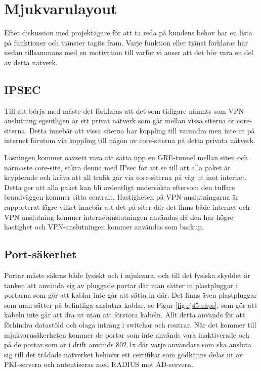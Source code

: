 \section{Mjukvarulayout}
Efter diskussion med projektägare för att ta reda på kundens behov har en lista på funktioner och tjänster tagits fram. Varje funktion eller tjänst förklaras här nedan tillsammans med en motivation till varför vi anser att det bör vara en del av detta nätverk.

\subsection{IPSEC}
    Till att börja med måste det förklaras att det som tidigare nämnts som VPN-anslutning egentligen är ett privat nätverk som går mellan vissa siterna or core-siterna. Detta innebär att vissa siterna har koppling till varandra men inte ut på internet förutom via koppling till någon av core-siterna på detta privata nätverk.
    
\noindent Lösningen kommer oavsett vara att sätta upp en GRE-tunnel mellan siten och närmaste core-site, säkra denna med IPsec för att se till att alla paket är krypterade och kräva att all trafik går via core-siterna på väg ut mot internet. Detta ger att alla paket kan bli ordentligt undersökta eftersom den tuffare brandväggen kommer sitta centralt. Hastigheten på VPN-anslutningarna är rapporterat lägre vilket innebär att det på siter där det finns både internet och VPN-anslutning kommer internetanslutningen användas då den har högre hastighet och VPN-anslutningen kommer användas som backup.

\subsection{Port-säkerhet}
    Portar måste säkras både fysiskt och i mjukvara, och till det fysiska skyddet är tanken att använda sig av pluggade portar där man sätter in plastpluggar i portarna som gör att kablar inte går att sätta in där. Det finns även plastpluggar som man sätter på befintliga anslutna kablar, se Figur \ref{fig:rj45-caps}, som gör att kabeln inte går att dra ut utan att förstöra kabeln. Allt detta används för att förhindra datastöld och olaga intrång i switchar och routrar. När det kommer till mjukvarusäkerheten kommer de portar som inte används vara inaktiverade och på de portar som är i drift används 802.1x där varje användare som ska ansluta sig till det trådade nätverket behöver ett certifikat som godkänns delas ut av PKI-servern och autentiseras med RADIUS mot AD-servern.
    

